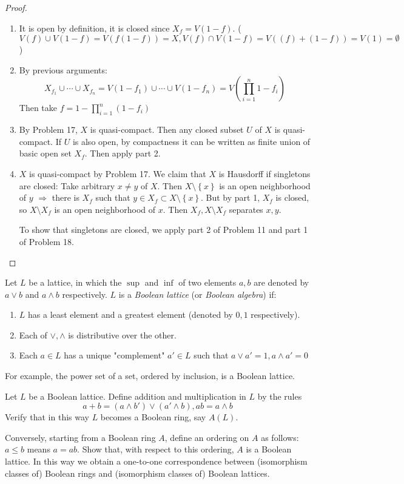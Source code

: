 \documentclass{solution}
\begin{document}
\begin{proof}
    \begin{enumerate}
        \item It is open by definition, it is closed since $X_f = V(1 - f)$. ($V(f) \cup V(1 - f) = V(f(1 - f)) = X, V(f) \cap V(1 - f) = V((f) + (1 - f)) = V(1) = \emptyset$)
        \item By previous arguments:
        $$X_{f_1} \cup \cdots \cup X_{f_n} = V(1 - f_1) \cup \cdots  \cup V(1 - f_n) = V\left(\prod\limits_{i = 1}^{n} 1 - f_i\right)$$
        Then take $f = 1 - \prod\limits_{i = 1}^{n} (1 - f_i)$
        \item By Problem 17, $X$ is quasi-compact. Then any closed subset $U$ of $X$ is quasi-compact. If $U$ is also open, by compactness it can be written as finite union of basic open set $X_f$. Then apply part 2.
        \item $X$ is quasi-compact by Problem 17. We claim that $X$ is Hausdorff if singletons are closed: Take arbitrary $x \ne y$ of $X$. Then $X \setminus \left\lbrace x \right\rbrace$ is an open neighborhood of $y$ $\Rightarrow$ there is $X_f$ such that $y \in X_f \subset X \setminus \left\lbrace x \right\rbrace$. But by part 1, $X_f$ is closed, so $X \setminus X_f$ is an open neighborhood of $x$. Then $X_f, X \setminus X_f$ separates $x, y$.
        
        To show that singletons are closed, we apply part 2 of Problem 11 and part 1 of Problem 18.
    \end{enumerate}
\end{proof}

\begin{problem}
    Let $L$ be a lattice, in which the $\sup$ and $\inf$ of two elements $a, b$ are denoted by $a \vee b$ and $a \wedge b$ respectively. $L$ is a \textit{Boolean lattice} (or \textit{Boolean algebra}) if:
    \begin{enumerate}
        \item $L$ has a least element and a greatest element (denoted by $0, 1$ respectively).
        \item Each of $\vee, \wedge$ is distributive over the other.
        \item Each $a \in L$ has a unique "complement" $a' \in L$ such that $a \vee a' = 1, a \wedge a' = 0$
    \end{enumerate}

    For example, the power set of a set, ordered by inclusion, is a Boolean lattice.

    Let $L$ be a Boolean lattice. Define addition and multiplication in $L$ by the rules
    $$a + b = (a \wedge b') \vee(a' \wedge b), ab = a \wedge b$$
    Verify that in this way $L$ becomes a Boolean ring, say $A(L)$.

    Conversely, starting from a Boolean ring $A$, define an ordering on $A$ as follows: $a \le b$ means $a = ab$. Show that, with respect to this ordering, $A$ is a Boolean lattice. In this way we obtain a one-to-one correspondence between (isomorphism classes of) Boolean rings and (isomorphism classes of) Boolean lattices.
\end{problem}
\end{document}

